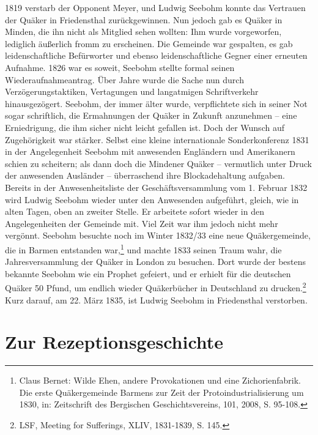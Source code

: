 1819 verstarb der Opponent Meyer, und Ludwig Seebohm konnte das Vertrauen der
Quäker in Friedensthal zurückgewinnen. Nun jedoch gab es Quäker in
Minden, die ihn nicht als Mitglied sehen wollten: Ihm wurde
vorgeworfen, lediglich äußerlich fromm zu erscheinen. Die Gemeinde war
gespalten, es gab leidenschaftliche Befürworter und ebenso leidenschaftliche
Gegner einer erneuten Aufnahme. 1826 war es soweit, Seebohm stellte formal
seinen Wiederaufnahmeantrag. Über Jahre wurde
die Sache nun durch Verzögerungstaktiken, Vertagungen und langatmigen
Schriftverkehr hinausgezögert. Seebohm, der immer älter wurde, verpflichtete
sich in seiner Not sogar schriftlich, die Ermahnungen der Quäker in Zukunft
anzunehmen -- eine Erniedrigung, die ihm sicher nicht leicht gefallen ist. Doch
der Wunsch auf Zugehörigkeit war stärker. Selbst eine kleine internationale
Sonderkonferenz 1831 in der Angelegenheit Seebohm mit anwesenden Engländern und
Amerikanern schien zu scheitern; als dann doch die Mindener Quäker -- vermutlich
unter Druck der anwesenden Ausländer -- überraschend ihre Blockadehaltung
aufgaben. Bereits in der Anwesenheitsliste der Geschäftsversammlung vom 1.
Februar 1832 wird Ludwig Seebohm wieder unter den Anwesenden aufgeführt, gleich,
wie in alten Tagen, oben an zweiter Stelle. Er arbeitete sofort wieder in den
Angelegenheiten der Gemeinde mit. Viel Zeit war ihm jedoch nicht mehr vergönnt.
Seebohm besuchte noch im Winter 1832/33 eine neue Quäkergemeinde, die in
Barmen entstanden war,\footnote{Claus Bernet: Wilde Ehen,
andere Provokationen und eine Zichorienfabrik.
Die erste Quäkergemeinde Barmens zur Zeit der Protoindustrialisierung um 1830,
in: Zeitschrift des Bergischen Geschichtsvereins, 101, 2008, S. 95-108.} und
machte 1833 seinen Traum wahr, die Jahresversammlung der Quäker in London zu
besuchen. Dort wurde der bestens bekannte Seebohm wie ein
Prophet gefeiert, und er erhielt für die deutschen
Quäker 50 Pfund, um endlich wieder Quäkerbücher in Deutschland zu
drucken.\footnote{LSF, Meeting for Sufferings, XLIV, 1831-1839, S. 145.} Kurz
darauf, am 22. März 1835, ist Ludwig Seebohm in Friedensthal verstorben.

\section{Zur Rezeptionsgeschichte}\label{ref:rezeptionsgeschichte}

